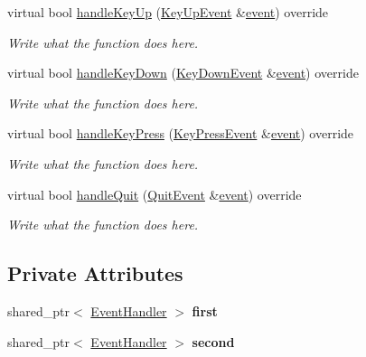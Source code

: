\begin{DoxyCompactItemize}
virtual bool \hyperlink{classCombinedEventHandler_aa4fc97e377238948995cf04b10816094}{handle\+Key\+Up} (\hyperlink{classKeyUpEvent}{Key\+Up\+Event} \&\hyperlink{unionSDL__Event}{event}) override
\begin{DoxyCompactList}\small\item\em Write what the function does here. \end{DoxyCompactList}\item 
virtual bool \hyperlink{classCombinedEventHandler_a12c529bbe80bc54ffb0479b11c4cb896}{handle\+Key\+Down} (\hyperlink{classKeyDownEvent}{Key\+Down\+Event} \&\hyperlink{unionSDL__Event}{event}) override
\begin{DoxyCompactList}\small\item\em Write what the function does here. \end{DoxyCompactList}\item 
virtual bool \hyperlink{classCombinedEventHandler_a33f19194d740dc1a9af2f05fe00243bb}{handle\+Key\+Press} (\hyperlink{structKeyPressEvent}{Key\+Press\+Event} \&\hyperlink{unionSDL__Event}{event}) override
\begin{DoxyCompactList}\small\item\em Write what the function does here. \end{DoxyCompactList}\item 
virtual bool \hyperlink{classCombinedEventHandler_aeb9ba179ea0ea968303387f085ff424c}{handle\+Quit} (\hyperlink{structQuitEvent}{Quit\+Event} \&\hyperlink{unionSDL__Event}{event}) override
\begin{DoxyCompactList}\small\item\em Write what the function does here. \end{DoxyCompactList}\end{DoxyCompactItemize}
\subsection*{Private Attributes}
\begin{DoxyCompactItemize}
\item 
\hypertarget{classCombinedEventHandler_a9a137fe3fb3af1e98bde49d167f96f40}{shared\+\_\+ptr$<$ \hyperlink{structEventHandler}{Event\+Handler} $>$ {\bfseries first}}\label{classCombinedEventHandler_a9a137fe3fb3af1e98bde49d167f96f40}

\item 
\hypertarget{classCombinedEventHandler_a9099834af829d75a109e680c5704c66a}{shared\+\_\+ptr$<$ \hyperlink{structEventHandler}{Event\+Handler} $>$ {\bfseries second}}\label{classCombinedEventHandler_a9099834af829d75a109e680c5704c66a}

\end{DoxyCompactItemize}


